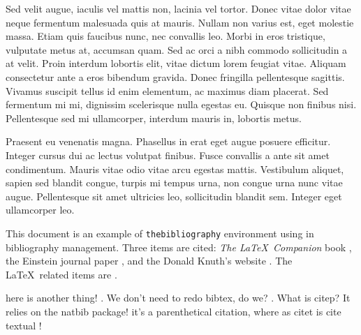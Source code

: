 \documentclass{article}
\begin{document}
Sed velit augue, iaculis vel mattis non, lacinia vel tortor.
Donec vitae dolor vitae neque fermentum malesuada quis at mauris.
Nullam non varius est, eget molestie massa.
Etiam quis faucibus nunc, nec convallis leo.
Morbi in eros tristique, vulputate metus at, accumsan quam.
Sed ac orci a nibh commodo sollicitudin a at velit.
Proin interdum lobortis elit, vitae dictum lorem feugiat vitae.
Aliquam consectetur ante a eros bibendum gravida.
Donec fringilla pellentesque sagittis.
Vivamus suscipit tellus id enim elementum, ac maximus diam placerat.
Sed fermentum mi mi, dignissim scelerisque nulla egestas eu.
Quisque non finibus nisi.
Pellentesque sed mi ullamcorper, interdum mauris in, lobortis metus.


Praesent eu venenatis magna.
Phasellus in erat eget augue posuere efficitur.
Integer cursus dui ac lectus volutpat finibus.
Fusce convallis a ante sit amet condimentum.
Mauris vitae odio vitae arcu egestas mattis.
Vestibulum aliquet, sapien sed blandit congue, turpis mi tempus urna, non congue urna nunc vitae augue.
Pellentesque sit amet ultricies leo, sollicitudin blandit sem.
Integer eget ullamcorper leo.

This document is an example of \texttt{thebibliography} environment using 
in bibliography management. Three items are cited: \textit{The \LaTeX\ Companion} 
book \cite{latexcompanion}, the Einstein journal paper \cite{einstein}, and the 
Donald Knuth's website \cite{knuthwebsite}. The \LaTeX\ related items are
\cite{latexcompanion,knuthwebsite}.

here is another thing! \cite{einstein}.
We don't need to redo bibtex, do we? \cite{knuthwebsite}.
What is citep? \citep[3]{einstein} It relies on the natbib package!
it's a parenthetical citation, where as citet is cite textual \citet{einstein}!



\end{document}
